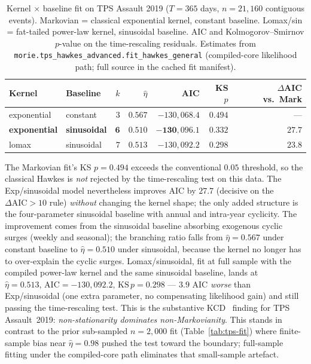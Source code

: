 \documentclass[article,shortnames,nojss]{jss}
\newcommand{\1}{\mathbbm{1}}
\theoremstyle{plain}
\theoremstyle{definition}
\begin{document}
\begin{table}[h]
\centering\footnotesize
\caption{Kernel $\times$ baseline fit on TPS Assault 2019
($T=365$ days, $n=21{,}160$ contiguous events).  Markovian =
classical exponential kernel, constant baseline.  Lomax/sin =
fat-tailed power-law kernel, sinusoidal baseline.  AIC and
Kolmogorov--Smirnov $p$-value on the time-rescaling residuals.
Estimates from \texttt{morie.tps\_hawkes\_advanced.fit\_hawkes\_general}
(compiled-core likelihood path; full source in the cached fit
manifest).}
\label{tab:tps-fit-2019}
\begin{tabular}{llrrrrr}
\toprule
Kernel & Baseline & $k$ & $\hat\eta$ & AIC & KS $p$ & $\Delta$AIC vs.\ Mark\\\midrule
exponential & constant   & $3$ & $0.567$ & $-130{,}068.4$ & $0.494$ & ---\\
\textbf{exponential} & \textbf{sinusoidal} & $\mathbf{6}$ & $\mathbf{0.510}$ & $\mathbf{-130{,}096.1}$ & $\mathbf{0.332}$ & $\mathbf{27.7}$\\
lomax        & sinusoidal & $7$ & $0.513$ & $-130{,}092.2$ & $0.298$ & $23.8$\\
\bottomrule
\end{tabular}
\end{table}

The Markovian fit's KS $p=0.494$ exceeds the conventional $0.05$
threshold, so the classical Hawkes is \emph{not} rejected by the
time-rescaling test on this data.  The Exp/sinusoidal model
nevertheless improves AIC by $27.7$ (decisive on the
\citet{BurnhamAnderson2002} $\Delta\mathrm{AIC} > 10$ rule)
\emph{without} changing the kernel shape; the only added
structure is the four-parameter sinusoidal baseline with annual
and intra-year cyclicity.  The improvement comes from the
sinusoidal baseline absorbing exogenous cyclic surges (weekly
and seasonal); the branching ratio falls from $\hat\eta=0.567$
under constant baseline to $\hat\eta=0.510$ under sinusoidal,
because the kernel no longer has to over-explain the cyclic
surges.  Lomax/sinusoidal, fit at full sample with the compiled
power-law kernel and the same sinusoidal baseline, lands at
$\hat\eta=0.513,\,\text{AIC}=-130{,}092.2,\,\text{KS}\,p=0.298$
--- $3.9$ AIC \emph{worse} than Exp/sinusoidal (one extra
parameter, no compensating likelihood gain) and still passing
the time-rescaling test.  This is the substantive
KCD~\citep{kwan2025nonstationary} finding for TPS Assault~2019:
\emph{non-stationarity dominates non-Markovianity}.  This
stands in contrast to the prior sub-sampled $n=2{,}000$ fit
(Table~\ref{tab:tps-fit}) where finite-sample bias near
$\hat\eta=0.98$ pushed the test toward the boundary; full-sample
fitting under the compiled-core path eliminates that small-sample
artefact.
\end{document}

